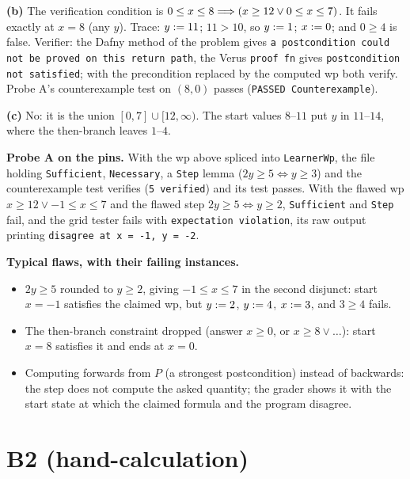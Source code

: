 \documentclass[11pt]{article}
\begin{document}
\textbf{(b)} The verification condition is
$0 \leq x \leq 8 \Longrightarrow (x \geq 12 \vee 0 \leq x \leq 7)$. It fails exactly at
$x = 8$ (any $y$). Trace: $y \mathrel{:=} 11$; $11 > 10$, so $y \mathrel{:=} 1$;
$x \mathrel{:=} 0$; and $0 \geq 4$ is false. Verifier: the Dafny method of the
problem gives \texttt{a postcondition could not be proved on this return path},
the Verus \texttt{proof fn} gives \texttt{postcondition not satisfied}; with
the precondition replaced by the computed wp both verify. Probe A's
counterexample test on $(8, 0)$ passes (\texttt{PASSED Counterexample}).

\textbf{(c)} No: it is the union $[0, 7] \cup [12, \infty)$. The start values
$8$--$11$ put $y$ in $11$--$14$, where the then-branch leaves $1$--$4$.

\textbf{Probe A on the pins.} With the wp above spliced into
\texttt{LearnerWp}, the file holding \texttt{Sufficient}, \texttt{Necessary},
a \texttt{Step} lemma ($2y \geq 5 \Leftrightarrow y \geq 3$) and the
counterexample test verifies (\texttt{5 verified}) and its test passes. With
the flawed wp $x \geq 12 \vee -1 \leq x \leq 7$ and the flawed step
$2y \geq 5 \Leftrightarrow y \geq 2$, \texttt{Sufficient} and \texttt{Step}
fail, and the grid tester fails with \texttt{expectation violation}, its raw
output printing \texttt{disagree at x = -1, y = -2}.

\textbf{Typical flaws, with their failing instances.}
\begin{itemize}
\item $2y \geq 5$ rounded to $y \geq 2$, giving $-1 \leq x \leq 7$ in the second
  disjunct: start $x = -1$ satisfies the claimed wp, but $y \mathrel{:=} 2$,
  $y \mathrel{:=} 4$, $x \mathrel{:=} 3$, and $3 \geq 4$ fails.
\item The then-branch constraint dropped (answer $x \geq 0$, or
  $x \geq 8 \vee \dots$): start $x = 8$ satisfies it and ends at $x = 0$.
\item Computing forwards from $P$ (a strongest postcondition) instead of
  backwards: the step does not compute the asked quantity; the grader shows
  it with the start state at which the claimed formula and the program
  disagree.
\end{itemize}

\section*{B2 (hand-calculation)}
\end{document}
